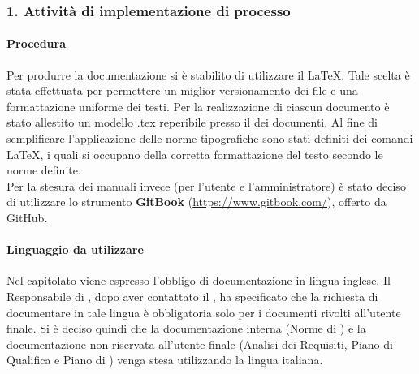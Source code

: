 \subsubsection{1. Attivit\`a di implementazione di processo}    %
  \paragraph*{Procedura}
  Per produrre la documentazione si è stabilito di utilizzare il  \LaTeX. Tale scelta è stata effettuata per permettere un miglior versionamento dei file e una formattazione uniforme dei testi.
  Per la realizzazione di ciascun documento \`e stato allestito un modello .tex reperibile presso il  dei documenti. Al fine di 
  semplificare l'applicazione delle norme tipografiche sono stati definiti dei comandi \LaTeX, i quali si occupano della corretta formattazione del testo
  secondo le norme definite.\\
  Per la stesura dei manuali invece (per l'utente e l'amministratore) è stato deciso di utilizzare lo strumento \textbf{GitBook} (\url{https://www.gitbook.com/}), offerto 
  da GitHub.
  \paragraph*{Linguaggio da utilizzare}
  Nel capitolato viene espresso l'obbligo di documentazione in lingua inglese. Il Responsabile di , dopo aver contattato il , ha specificato che la richiesta di documentare in tale lingua è obbligatoria solo per i documenti rivolti all'utente finale. Si è deciso quindi che la documentazione interna (Norme di ) e la documentazione non riservata all'utente finale (Analisi dei Requisiti, Piano di Qualifica e Piano di ) venga stesa utilizzando la lingua italiana.  
  





